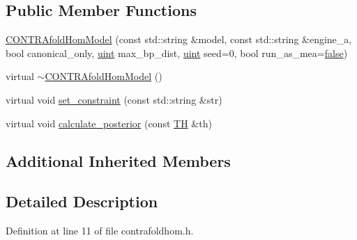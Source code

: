 \subsection*{Public Member Functions}
\begin{DoxyCompactItemize}
\item 
\hyperlink{class_c_o_n_t_r_afold_hom_model_a272122466851c652b00374cc62387c19}{C\+O\+N\+T\+R\+Afold\+Hom\+Model} (const std\+::string \&model, const std\+::string \&engine\+\_\+a, bool canonical\+\_\+only, \hyperlink{cyktable_8h_a91ad9478d81a7aaf2593e8d9c3d06a14}{uint} max\+\_\+bp\+\_\+dist, \hyperlink{cyktable_8h_a91ad9478d81a7aaf2593e8d9c3d06a14}{uint} seed=0, bool run\+\_\+as\+\_\+mea=\hyperlink{naview_8c_a65e9886d74aaee76545e83dd09011727}{false})
\item 
virtual \hyperlink{class_c_o_n_t_r_afold_hom_model_a658d01c3442f5e05e2df3c84ac5f02b0}{$\sim$\+C\+O\+N\+T\+R\+Afold\+Hom\+Model} ()
\item 
virtual void \hyperlink{class_c_o_n_t_r_afold_hom_model_af152e89d182c3371df6412a40fcc2b5e}{set\+\_\+constraint} (const std\+::string \&str)
\item 
virtual void \hyperlink{class_c_o_n_t_r_afold_hom_model_a5274d9b038e5d213d4ec8900713d820e}{calculate\+\_\+posterior} (const \hyperlink{class_t_h}{T\+H} \&th)
\end{DoxyCompactItemize}
\subsection*{Additional Inherited Members}


\subsection{Detailed Description}


Definition at line 11 of file contrafoldhom.\+h.



